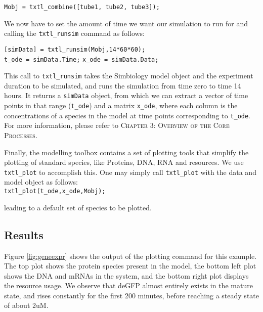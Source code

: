 				\begin{flushleft}
						\texttt{Mobj = txtl\_combine([tube1, tube2, tube3]);} \\	
				\end{flushleft}
							
We now have to set the amount of time we want our simulation to run for and calling the \texttt{txtl\_runsim} command as follows:	

				\begin{flushleft}
						\texttt{[simData] = txtl\_runsim(Mobj,14*60*60);} \\
						\texttt{t\_ode = simData.Time;}
						\texttt{x\_ode = simData.Data;}
				\end{flushleft}	
This call to \texttt{txtl\_runsim} takes the Simbiology model object and the experiment duration to be simulated, and runs the simulation from time zero to time 14 hours. It returns a \texttt{simData} object, from which we can extract a vector of time points in that range (\texttt{t\_ode}) and a matrix \texttt{x\_ode}, where each column is the concentrations of a species in the model at time points corresponding to \texttt{t\_ode}. For more information, please refer to \textsc{Chapter 3: Overview of the Core Processes}. 

Finally, the modelling toolbox contains a set of plotting tools that simplify the plotting of standard species, like Proteins, DNA, RNA and resources. We use \texttt{txtl\_plot} to accomplish this. One may simply call \texttt{txtl\_plot} with the data and model object as follows: \\

\noindent \texttt{txtl\_plot(t\_ode,x\_ode,Mobj); \\}

\noindent leading to a default set of species to be plotted. 
						
		\subsection{Results}
		
		Figure \ref{fig:geneexpr} shows the output of the plotting command for this example. The top plot shows the protein species present in the model, the bottom left plot shows the DNA and mRNAs in the system, and the bottom right plot displays the resource usage. We observe that deGFP almost entirely exists in the mature state, and rises constantly for the first 200 minutes, before reaching a steady state of about 2uM.\\
		
